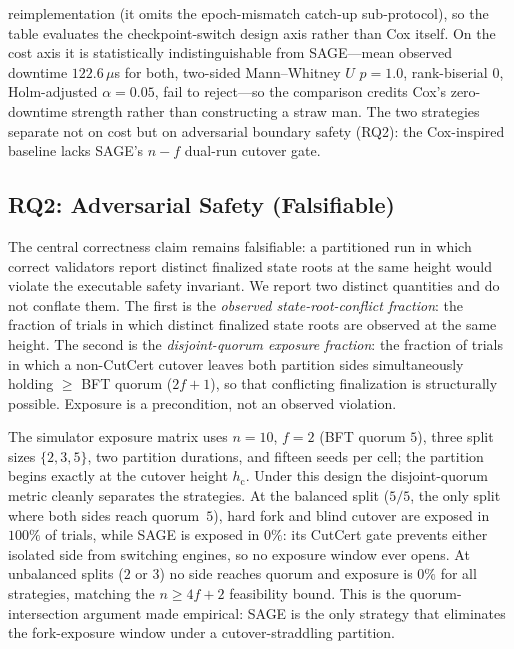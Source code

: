 \documentclass[journal]{IEEEtran}
\theoremstyle{definition}
\theoremstyle{remark}
\begin{document}
\begin{table}[t]
\begin{threeparttable}
\begin{tablenotes}
reimplementation (it omits the epoch-mismatch catch-up sub-protocol), so the table evaluates the
checkpoint-switch design axis rather than Cox itself. On the cost axis it is statistically
indistinguishable from SAGE---mean observed downtime $122.6\,\mu$s for both, two-sided
Mann--Whitney $U$ $p=1.0$, rank-biserial $0$, Holm-adjusted $\alpha=0.05$, fail to reject---so the
comparison credits Cox's zero-downtime strength rather than constructing a straw man. The two
strategies separate not on cost but on adversarial boundary safety (RQ2): the Cox-inspired baseline
lacks SAGE's $n{-}f$ dual-run cutover gate.
\end{tablenotes}
\end{threeparttable}
\end{table}

\subsection{RQ2: Adversarial Safety (Falsifiable)}
\label{sec:rq2}
The central correctness claim remains falsifiable: a partitioned run in which correct validators
report distinct finalized state roots at the same height would violate the executable safety
invariant. We report two distinct quantities and do not conflate them. The first is the
\emph{observed state-root-conflict fraction}: the fraction of trials in which distinct finalized
state roots are observed at the same height. The second
is the \emph{disjoint-quorum exposure fraction}: the fraction of trials in which a non-CutCert
cutover leaves both partition sides simultaneously holding $\ge$ BFT quorum ($2f{+}1$), so that
conflicting finalization is structurally possible. Exposure is a precondition, not an observed
violation.

The simulator exposure matrix uses $n{=}10$, $f{=}2$ (BFT quorum $5$), three split sizes
$\{2,3,5\}$, two partition durations, and fifteen seeds per cell; the partition begins exactly at
the cutover height $h_{\mathrm{c}}$. Under this design the disjoint-quorum metric cleanly
separates the strategies. At the balanced split ($5/5$, the only split where both sides reach
quorum~$5$), hard fork and blind cutover are exposed in $100\%$ of trials, while SAGE is exposed
in $0\%$: its CutCert gate prevents either isolated side from switching engines, so no exposure
window ever opens. At unbalanced splits ($2$ or $3$) no side reaches quorum and exposure is $0\%$
for all strategies, matching the $n\ge 4f{+}2$ feasibility bound. This is the quorum-intersection
argument made empirical: SAGE is the only strategy that eliminates the fork-exposure window under
a cutover-straddling partition.
\end{document}
